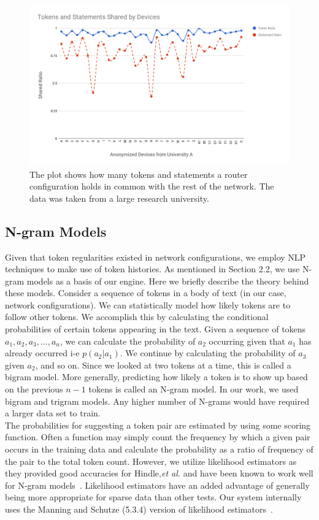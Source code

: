 \begin{figure}[H]
	\centering
	\includegraphics[width=\textwidth]{chart.png}
	\caption{The plot shows how many tokens and statements a router configuration holds in common with the rest of the network. The data was taken from a large research university.}
\end{figure}

\subsection{N-gram Models}

Given that token regularities existed in network configurations, we employ NLP techniques to make use of token histories. As mentioned in Section 2.2, we use N-gram models as a basis of our engine. Here we briefly describe the theory behind these models. Consider a sequence of tokens in a body of text (in our case, network configurations). We can statistically model how likely tokens are to follow other tokens. We accomplish this by calculating the conditional probabilities of certain tokens appearing in the text. Given a sequence of tokens $a_1,a_2,a_3,...,a_n$, we can calculate the probability of $a_2$ occurring given that $a_1$ has already occurred i-e $p(a_2 | a_1)$. We continue by calculating the probability of $a_3$ given $a_2$, and so on. Since we looked at two tokens at a time, this is called a bigram model. More generally, predicting how likely a token is to show up based on the previous $n-1$ tokens is called an N-gram model. In our work, we used bigram and trigram models. Any higher number of N-grams would have required a larger data set to train.\\

The probabilities for suggesting a token pair are estimated by using some scoring function. Often a function may simply count the frequency by which a given pair occurs in the training data and calculate the probability as a ratio of frequency of the pair to the total token count. However, we utilize likelihood estimators as they provided good accuracies for Hindle,\textit{et al.} and have been known to work well for N-gram models~\cite{manning}. Likelihood estimators have an added advantage of generally being more appropriate for sparse data than other tests. Our system internally uses the Manning and Schutze (5.3.4) version of likelihood estimators~\cite{manning}.

